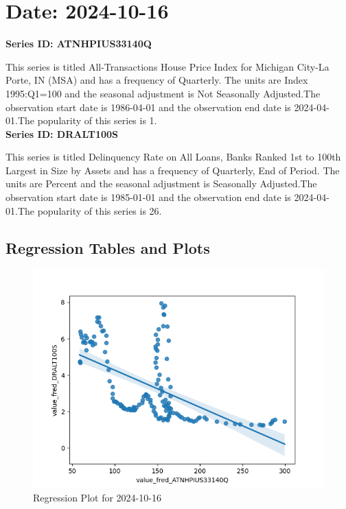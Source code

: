 \section{Date: 2024-10-16}
\noindent \textbf{Series ID: ATNHPIUS33140Q} 

\noindent This series is titled All-Transactions House Price Index for Michigan City-La Porte, IN (MSA) and has a frequency of Quarterly. The units are Index 1995:Q1=100 and the seasonal adjustment is Not Seasonally Adjusted.The observation start date is 1986-04-01 and the observation end date is 2024-04-01.The popularity of this series is 1. \\ 

\noindent \textbf{Series ID: DRALT100S} 

\noindent This series is titled Delinquency Rate on All Loans, Banks Ranked 1st to 100th Largest in Size by Assets and has a frequency of Quarterly, End of Period. The units are Percent and the seasonal adjustment is Seasonally Adjusted.The observation start date is 1985-01-01 and the observation end date is 2024-04-01.The popularity of this series is 26. \\ 

\subsection{Regression Tables and Plots}


\begin{figure}
\centering
\includegraphics[scale = 0.9]{plots/plot_2024-10-16.png}
\caption{Regression Plot for 2024-10-16}
\end{figure}
\newpage
